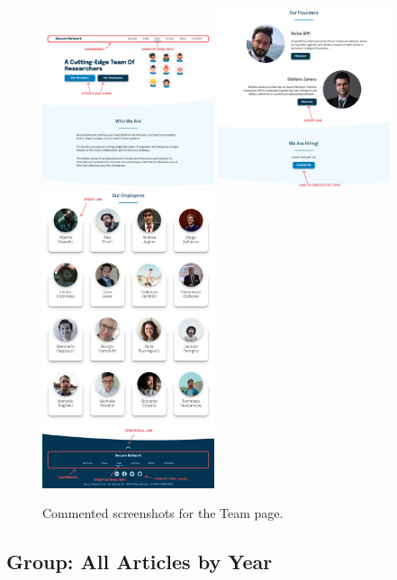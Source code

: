 \documentclass[12pt]{report}
\begin{document}
\begin{figure}[H]
	\centering
	\includegraphics[width=0.45\textwidth]{high_fid_wireframes/team/1.png}
	\includegraphics[width=0.45\textwidth]{high_fid_wireframes/team/2.png}
	\includegraphics[width=0.45\textwidth]{high_fid_wireframes/team/3.png}
	\caption{Commented screenshots for the Team page.}
\end{figure}

\subsection{Group: All Articles by Year}
\end{document}
